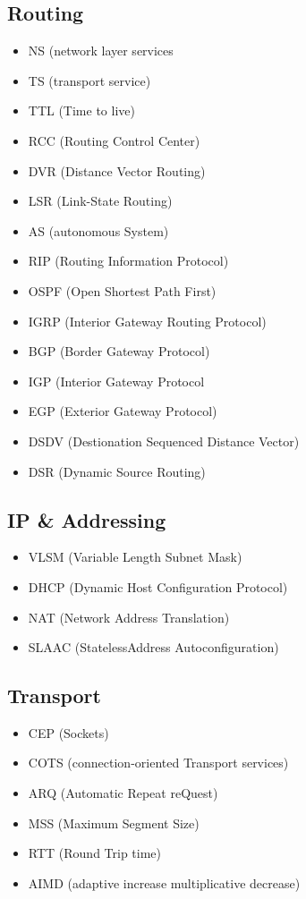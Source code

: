 	\subsection{Routing}
		\begin{itemize}
			\item NS (network layer services
			\item TS (transport service)
			\item TTL (Time to live)
			\item RCC (Routing Control Center)
			\item DVR (Distance Vector Routing)
			\item LSR (Link-State Routing)
			\item AS (autonomous System)
			\item RIP (Routing Information Protocol)
			\item OSPF (Open Shortest Path First)
			\item IGRP (Interior Gateway Routing Protocol)
			\item BGP (Border Gateway Protocol)
			\item IGP (Interior Gateway Protocol
			\item EGP (Exterior Gateway Protocol)
			\item DSDV (Destionation Sequenced Distance Vector)
			\item DSR (Dynamic Source Routing)
		\end{itemize}
	\subsection{IP \& Addressing}
		\begin{itemize}
			\item VLSM (Variable Length Subnet Mask)
			\item DHCP (Dynamic Host Configuration Protocol)
			\item NAT (Network Address Translation)
			\item SLAAC (StatelessAddress Autoconfiguration)
		\end{itemize}
	\subsection{Transport}
		\begin{itemize}
			\item CEP (Sockets)
			\item COTS (connection-oriented Transport services)
			\item ARQ (Automatic Repeat reQuest)
			\item MSS (Maximum Segment Size)
			\item RTT (Round Trip time)
			\item AIMD (adaptive increase multiplicative decrease)
		\end{itemize}